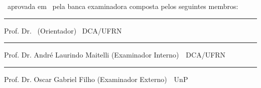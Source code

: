 \begin{titlepage}
\begin{center}

\LARGE

\textbf{\titulo}

\vfill

\Large

\textbf{\autor}

\end{center}

\vfill

\noindent
\documento\ aprovada em \dataaprovacao\ pela banca examinadora composta pelos
seguintes membros:

\begin{center}


\vspace{1.5cm}\rule{0.95\linewidth}{1pt}
\parbox{0.9\linewidth}{%
Prof. Dr. \orientador\ (Orientador) \dotfill\ DCA/UFRN}

\vspace{1.5cm}\rule{0.95\linewidth}{1pt}
\parbox{0.9\linewidth}{%
Prof. Dr. André Laurindo Maitelli (Examinador Interno)\ \dotfill\ DCA/UFRN}

\vspace{1.5cm}\rule{0.95\linewidth}{1pt}
\parbox{0.9\linewidth}{%
Prof. Dr. Oscar Gabriel Filho (Examinador Externo)\ \dotfill\ UnP}

\end{center}
\end{titlepage}
